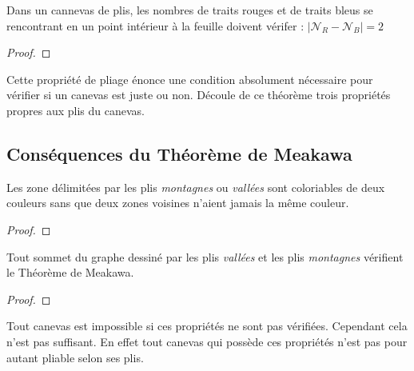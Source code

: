 \documentclass[a4paper,12pt,french,draft]{report}
\begin{document}
      \begin{theorem}
        Dans un cannevas de plis, les nombres de traits rouges et  de traits bleus se rencontrant en un point intérieur à la feuille doivent vérifer : \(|\mathscr{N}_{R}-\mathscr{N}_{B}|=2\)
       
      \end{theorem}
    
      \begin{proof}
      \end{proof}
    
      Cette propriété de pliage énonce une condition absolument nécessaire pour vérifier si un canevas est juste ou non.
      Découle de ce théorème trois propriétés propres aux plis du canevas.
      
    \subsection{Conséquences du Théorème de Meakawa}
    
      \begin{proposition}
        
        Les zone délimitées par les plis \emph{montagnes} ou \emph{vallées} sont coloriables de deux couleurs sans que deux zones voisines n’aient jamais la même couleur.
      
      \end{proposition} 
      
      \begin{proof}
      \end{proof}
      
      
      \begin{proposition}
      
        Tout sommet du graphe dessiné par les plis \emph{vallées} et 
        les plis \emph{montagnes} vérifient le Théorème de Meakawa.
      
      \end{proposition}
      
      \begin{proof}
      \end{proof}
      
      \begin{remarque}
      
      Tout canevas est impossible si ces propriétés ne sont pas 
      vérifiées. Cependant cela n'est pas suffisant. En effet tout 
      canevas qui possède ces propriétés n'est pas pour autant 
      pliable selon ses plis.
      
      
      \end{remarque}
      
\end{document}
